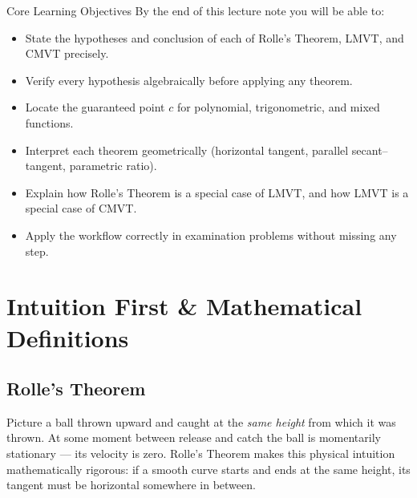 \documentclass[12pt,a4paper]{article}
\begin{document}
\begin{learnbox}{Core Learning Objectives}
By the end of this lecture note you will be able to:
\begin{itemize}
  \item State the hypotheses and conclusion of each of Rolle's Theorem, LMVT, and CMVT precisely.
  \item Verify every hypothesis algebraically before applying any theorem.
  \item Locate the guaranteed point $c$ for polynomial, trigonometric, and mixed functions.
  \item Interpret each theorem geometrically (horizontal tangent, parallel secant--tangent, parametric ratio).
  \item Explain how Rolle's Theorem is a special case of LMVT, and how LMVT is a special case of CMVT.
  \item Apply the workflow correctly in examination problems without missing any step.
\end{itemize}
\end{learnbox}

\section{Intuition First \& Mathematical Definitions}

\subsection{Rolle's Theorem}

Picture a ball thrown upward and caught at the \emph{same height} from which it was thrown.
At some moment between release and catch the ball is momentarily stationary --- its velocity is zero.
Rolle's Theorem makes this physical intuition mathematically rigorous: if a smooth curve starts and
ends at the same height, its tangent must be horizontal somewhere in between.
\end{document}
